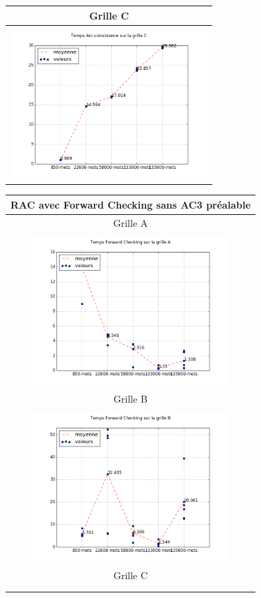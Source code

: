 \documentclass[a4paper,12pt]{report}
\begin{document}
\begin{enumerate}
\begin{table}[!h]
\begin{center}
\begin{tabular}{|c|}
\hline
Grille C\\
\hline
  \\
\includegraphics[width=7.5cm]{AC3_C.png} \\
\hline

\end{tabular}
\end{center}
\end{table}


\begin{table}[!h]
\begin{center}
\begin{tabular}{|c|}
\hline
 {RAC avec Forward Checking sans AC3 préalable} \\
\hline
\hline
  Grille A\\
\hline   
   \\
\includegraphics[width=7.5cm]{FC_A.png}  \\
\hline
Grille B \\
\hline 
\\
\includegraphics[width=7.5cm]{FC_B.png} \\
\hline
Grille C\\
\hline
  \\
 \\
\hline


\end{tabular}
\end{center}
\end{table}
\end{enumerate}
\end{document}
